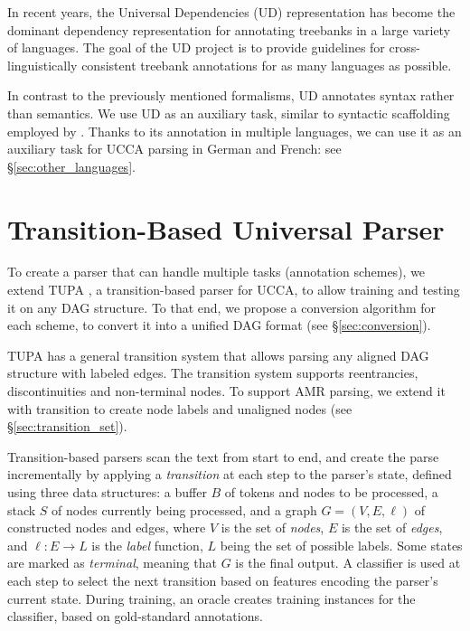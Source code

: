 \documentclass[11pt,a4paper]{article}
\begin{document}
In recent years, the Universal Dependencies
(UD) representation \cite{nivre2016universal,11234/1-2515} has become
the dominant dependency representation for
annotating treebanks in a large variety of languages.
The goal of the UD project is to provide
guidelines for cross-linguistically consistent treebank
annotations for as many languages as possible.

In contrast to the previously mentioned formalisms,
UD annotates syntax rather than semantics.
We use UD as an auxiliary task,
similar to syntactic scaffolding employed by \cite{swayamdipta2017frame}.
Thanks to its annotation in multiple languages, we can use it as an auxiliary task
for UCCA parsing in German and French: see \S\ref{sec:other_languages}.



\section{Transition-Based Universal Parser}\label{sec:model}

To create a parser that can handle multiple tasks (annotation schemes),
we extend TUPA \cite{hershcovich2017a}, a transition-based parser for UCCA,
to allow training and testing it on any DAG structure.
To that end, we propose a conversion algorithm for each scheme,
to convert it into a unified DAG format (see \S\ref{sec:conversion}).

TUPA has a general transition system that allows parsing any aligned DAG structure with labeled edges.
The transition system supports reentrancies, discontinuities and non-terminal nodes.
To support AMR parsing, we extend it with transition to create node labels and unaligned nodes
(see \S\ref{sec:transition_set}).

Transition-based parsers \cite{Nivre03anefficient} scan the text from start to end,
and create the parse incrementally by applying a \textit{transition}
at each step to the parser's state,
defined using three data structures: a buffer $B$ of tokens and nodes to be processed,
a stack $S$ of nodes currently being processed,
and a graph $G=(V,E,\ell)$ of constructed nodes and edges,
where $V$ is the set of \emph{nodes}, $E$ is the set of \emph{edges},
and $\ell : E \to L$ is the \emph{label} function, $L$ being the set of possible labels.
Some states are marked as \textit{terminal}, meaning that $G$ is the final output.
A classifier is used at each step to select the next transition based on features
encoding the parser's current state.
During training, an oracle creates training instances for the classifier,
based on gold-standard annotations.
\end{document}
